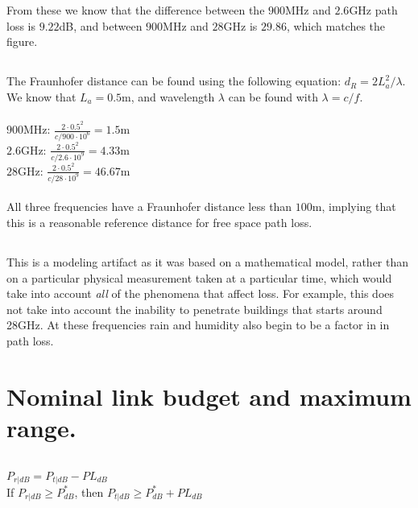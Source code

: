 \documentclass[]{article}
\begin{document}
From these we know that the difference between the $900$MHz and $2.6$GHz path loss is $9.22$dB, and between $900$MHz and $28$GHz is $29.86$, which matches the figure.

\subsection{}
The Fraunhofer distance can be found using the following equation: $d_R = 2L_a^2/\lambda$. We know that $L_a = 0.5$m, and wavelength $\lambda$ can be found with $\lambda = c/f$.\\\\

$900$MHz: $\frac{2 \cdot 0.5^2}{c/900 \cdot 10^{6}} = 1.5$m\\
$2.6$GHz: $\frac{2 \cdot 0.5^2}{c/2.6 \cdot 10^{9}} = 4.33$m\\
$28$GHz: $\frac{2 \cdot 0.5^2}{c/28 \cdot 10^{9}} = 46.67$m\\\\

All three frequencies have a Fraunhofer distance less than $100$m, implying that this is a reasonable reference distance for free space path loss.

\subsection{}
This is a modeling artifact as it was based on a mathematical model, rather than on a particular physical measurement taken at a particular time, which would take into account \textit{all} of the phenomena that affect loss. For example, this does not take into account the inability to penetrate buildings that starts around 28GHz. At these frequencies rain and humidity also begin to be a factor in in path loss.

\section{Nominal link budget and maximum range.}
\subsection{}
$P_{r|dB} = P_{t|dB} - PL_{dB}$\\
If $P_{r|dB} \geq P_{dB}^{*}$, then $P_{t|dB} \geq P_{dB}^{*} + PL_{dB}$\\\\
\end{document}
